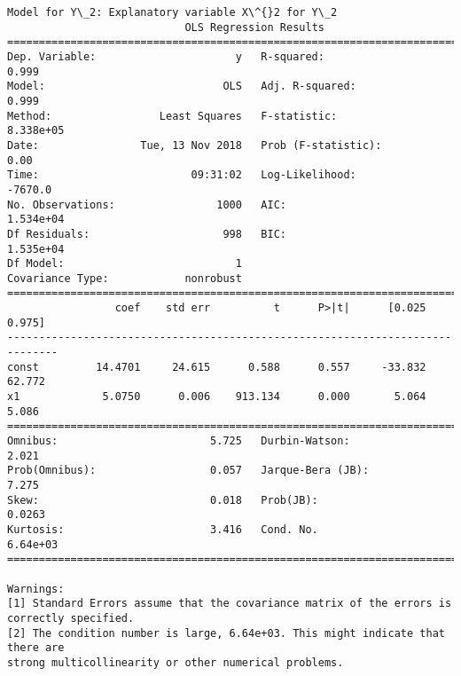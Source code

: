 \documentclass[11pt]{article}
\begin{document}
\begin{Verbatim}[commandchars=\\\{\}]
Model for Y\_2: Explanatory variable X\^{}2 for Y\_2
                            OLS Regression Results                            
==============================================================================
Dep. Variable:                      y   R-squared:                       0.999
Model:                            OLS   Adj. R-squared:                  0.999
Method:                 Least Squares   F-statistic:                 8.338e+05
Date:                Tue, 13 Nov 2018   Prob (F-statistic):               0.00
Time:                        09:31:02   Log-Likelihood:                -7670.0
No. Observations:                1000   AIC:                         1.534e+04
Df Residuals:                     998   BIC:                         1.535e+04
Df Model:                           1                                         
Covariance Type:            nonrobust                                         
==============================================================================
                 coef    std err          t      P>|t|      [0.025      0.975]
------------------------------------------------------------------------------
const         14.4701     24.615      0.588      0.557     -33.832      62.772
x1             5.0750      0.006    913.134      0.000       5.064       5.086
==============================================================================
Omnibus:                        5.725   Durbin-Watson:                   2.021
Prob(Omnibus):                  0.057   Jarque-Bera (JB):                7.275
Skew:                           0.018   Prob(JB):                       0.0263
Kurtosis:                       3.416   Cond. No.                     6.64e+03
==============================================================================

Warnings:
[1] Standard Errors assume that the covariance matrix of the errors is correctly specified.
[2] The condition number is large, 6.64e+03. This might indicate that there are
strong multicollinearity or other numerical problems.



\end{Verbatim}
\end{document}

